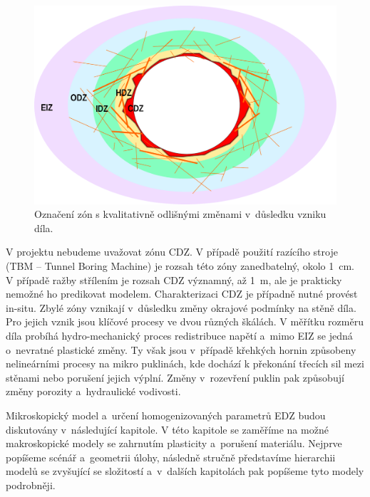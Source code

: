 \documentclass{article}
\newcommand{\js}[1]{{\color{blue} JS: #1}}
\begin{document}

\begin{figure}
    \centering
    \includegraphics[width=\textwidth]{graphics/EDZ_structure.pdf}
    \caption{Označení zón s kvalitativně odlišnými změnami v~důsledku vzniku díla.}
    \label{fig:edz_zones}
\end{figure}

V projektu nebudeme uvažovat zónu CDZ. V případě použití razícího stroje (TBM -- Tunnel Boring Machine) je rozsah této zóny zanedbatelný, okolo 1~cm. V případě 
ražby střílením je rozsah CDZ významný, až 1~m, ale je prakticky nemožné ho predikovat modelem. Charakterizaci CDZ je případně nutné provést in-situ.
Zbylé zóny vznikají v~důsledku změny okrajové podmínky na stěně díla. Pro jejich vznik jsou klíčové procesy ve dvou různých škálách. V měřítku rozměru 
díla probíhá hydro-mechanický proces redistribuce napětí a~mimo EIZ se jedná o~nevratné plastické změny. Ty však jsou v~případě křehkých hornin
způsobeny nelineárními procesy na mikro puklinách, kde dochází k překonání třecích sil mezi stěnami nebo porušení jejich výplní. 
Změny v~rozevření puklin pak způsobují změny porozity a~hydraulické vodivosti. 

Mikroskopický model a~určení homogenizovaných parametrů EDZ budou diskutovány v~následující kapitole.
V této kapitole se zaměříme na možné makroskopické modely se zahrnutím plasticity a~porušení materiálu.
Nejprve popíšeme scénář a~geometrii úlohy, následně stručně představíme hierarchii modelů se zvyšující se složitostí
a~v~dalších kapitolách pak popíšeme tyto modely podrobněji.
\end{document}
